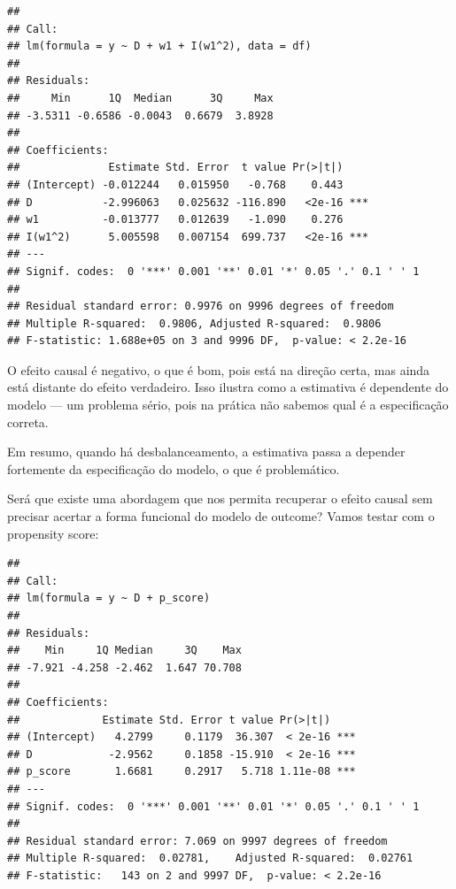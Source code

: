 \documentclass[
]{article}
\newenvironment{Shaded}{\begin{snugshade}}{\end{snugshade}}
\newcommand{\AttributeTok}[1]{\textcolor[rgb]{0.13,0.29,0.53}{#1}}
\newcommand{\FunctionTok}[1]{\textcolor[rgb]{0.13,0.29,0.53}{\textbf{#1}}}
\newcommand{\NormalTok}[1]{#1}
\newcommand{\OtherTok}[1]{\textcolor[rgb]{0.56,0.35,0.01}{#1}}
\newcommand{\SpecialCharTok}[1]{\textcolor[rgb]{0.81,0.36,0.00}{\textbf{#1}}}
\begin{document}
\begin{verbatim}
## 
## Call:
## lm(formula = y ~ D + w1 + I(w1^2), data = df)
## 
## Residuals:
##     Min      1Q  Median      3Q     Max 
## -3.5311 -0.6586 -0.0043  0.6679  3.8928 
## 
## Coefficients:
##              Estimate Std. Error  t value Pr(>|t|)    
## (Intercept) -0.012244   0.015950   -0.768    0.443    
## D           -2.996063   0.025632 -116.890   <2e-16 ***
## w1          -0.013777   0.012639   -1.090    0.276    
## I(w1^2)      5.005598   0.007154  699.737   <2e-16 ***
## ---
## Signif. codes:  0 '***' 0.001 '**' 0.01 '*' 0.05 '.' 0.1 ' ' 1
## 
## Residual standard error: 0.9976 on 9996 degrees of freedom
## Multiple R-squared:  0.9806, Adjusted R-squared:  0.9806 
## F-statistic: 1.688e+05 on 3 and 9996 DF,  p-value: < 2.2e-16
\end{verbatim}

O efeito causal é negativo, o que é bom, pois está na direção certa, mas ainda está distante do efeito verdadeiro. Isso ilustra como a estimativa é dependente do modelo --- um problema sério, pois na prática não sabemos qual é a especificação correta.

Em resumo, quando há desbalanceamento, a estimativa passa a depender fortemente da especificação do modelo, o que é problemático.

Será que existe uma abordagem que nos permita recuperar o efeito causal sem precisar acertar a forma funcional do modelo de outcome? Vamos testar com o propensity score:

\begin{Shaded}
\end{Shaded}

\begin{verbatim}
## 
## Call:
## lm(formula = y ~ D + p_score)
## 
## Residuals:
##    Min     1Q Median     3Q    Max 
## -7.921 -4.258 -2.462  1.647 70.708 
## 
## Coefficients:
##             Estimate Std. Error t value Pr(>|t|)    
## (Intercept)   4.2799     0.1179  36.307  < 2e-16 ***
## D            -2.9562     0.1858 -15.910  < 2e-16 ***
## p_score       1.6681     0.2917   5.718 1.11e-08 ***
## ---
## Signif. codes:  0 '***' 0.001 '**' 0.01 '*' 0.05 '.' 0.1 ' ' 1
## 
## Residual standard error: 7.069 on 9997 degrees of freedom
## Multiple R-squared:  0.02781,    Adjusted R-squared:  0.02761 
## F-statistic:   143 on 2 and 9997 DF,  p-value: < 2.2e-16
\end{verbatim}
\end{document}
